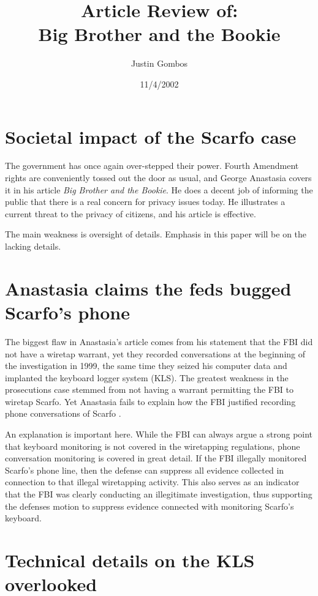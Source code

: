 ﻿\documentclass[12pt,titlepage]{article}             %
\title{Article Review of:\\Big Brother and the Bookie}
\author{Justin Gombos}
\date{11/4/2002}
\begin{document}
  \maketitle
  \baselineskip=19pt

  \section{Societal impact of the Scarfo case}
  
  The government has once again over-stepped their power.  Fourth
  Amendment rights are conveniently tossed out the door as usual, and
  George Anastasia covers it in his article \textit{Big Brother and
    the Bookie}.  He does a decent job of informing the public that
  there is a real concern for privacy issues today.  He illustrates a
  current threat to the privacy of citizens, and his article is
  effective.
  
  The main weakness is oversight of details.  Emphasis in this paper
  will be on the lacking details.

  \section{Anastasia claims the feds bugged Scarfo's phone}
  
  The biggest flaw in Anastasia's article comes from his statement
  that the FBI did not have a wiretap warrant, yet they recorded
  conversations at the beginning of the investigation in 1999, the
  same time they seized his computer data and implanted the keyboard
  logger system (KLS).  The greatest weakness in the prosecutions case
  stemmed from not having a warrant permitting the FBI to wiretap
  Scarfo.  Yet Anastasia fails to explain how the FBI justified
  recording phone conversations of Scarfo \cite{ANASTASIA}.
  
  An explanation is important here.  While the FBI can always argue a
  strong point that keyboard monitoring is not covered in the
  wiretapping regulations, phone conversation monitoring is covered in
  great detail.  If the FBI illegally monitored Scarfo's phone line,
  then the defense can suppress all evidence collected in connection
  to that illegal wiretapping activity.  This also serves as an
  indicator that the FBI was clearly conducting an illegitimate
  investigation, thus supporting the defenses motion to suppress
  evidence connected with monitoring Scarfo's keyboard.

  \section{Technical details on the KLS overlooked}
  
\end{document}
